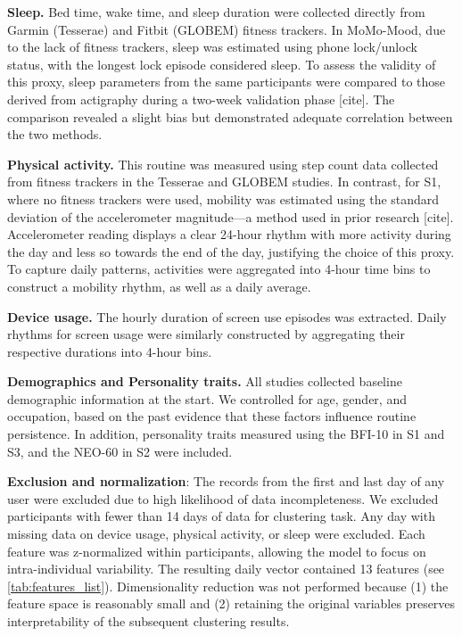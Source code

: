 \documentclass[pdflatex,sn-vancouver,Numbered]{bst/sn-jnl}%
\theoremstyle{thmstyleone}%
\theoremstyle{thmstyletwo}%
\theoremstyle{thmstylethree}%
\begin{document}
\textbf{Sleep.} Bed time, wake time, and sleep duration were collected directly from Garmin (Tesserae) and Fitbit (GLOBEM) fitness trackers. In MoMo-Mood, due to the lack of fitness trackers, sleep was estimated using phone lock/unlock status, with the longest lock episode considered sleep. To assess the validity of this proxy, sleep parameters from the same participants were compared to those derived from actigraphy during a two-week validation phase [cite]. The comparison revealed a slight bias but demonstrated adequate correlation between the two methods.

\textbf{Physical activity.} This routine was measured using step count data collected from fitness trackers in the Tesserae and GLOBEM studies. In contrast, for S1, where no fitness trackers were used, mobility was estimated using the standard deviation of the accelerometer magnitude—a method used in prior research [cite]. Accelerometer reading displays a clear 24-hour rhythm with more activity during the day and less so towards the end of the day, justifying the choice of this proxy. To capture daily patterns, activities were aggregated into 4-hour time bins to construct a mobility rhythm, as well as a daily average.

\textbf{Device usage. } The hourly duration of screen use episodes was extracted. Daily rhythms for screen usage were similarly constructed by aggregating their respective durations into 4-hour bins. 

\textbf{Demographics and Personality traits.} All studies collected baseline demographic information at the start. We controlled for age, gender, and occupation, based on the past evidence that these factors influence routine persistence. In addition, personality traits measured using the BFI-10 \cite{rammstedt2007measuring} in S1 and S3, and the NEO-60 \cite{costa1992neo} in S2 were included.

\textbf{Exclusion and normalization}: The records from the first and last day of any user were excluded due to high likelihood of data incompleteness. We excluded participants with fewer than 14 days of data for clustering task. Any day with missing data on device usage, physical activity, or sleep were excluded. Each feature was z-normalized within participants, allowing the model to focus on intra-individual variability. The resulting daily vector contained 13 features (see \autoref{tab:features_list}). Dimensionality reduction was not performed because (1) the feature space is reasonably small and (2) retaining the original variables preserves interpretability of the subsequent clustering results.
\end{document}
